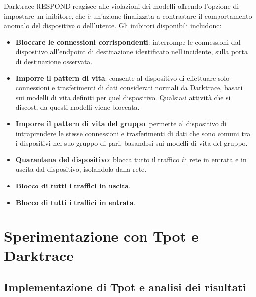 \documentclass[12pt,a4paper,oneside,onecolumn,openright]{book}
\begin{document}
	
	Darktrace RESPOND reagisce alle violazioni dei modelli offrendo l'opzione di impostare 
	un inibitore, che è un'azione finalizzata a contrastare il comportamento anomalo del 
	dispositivo o dell'utente. Gli inibitori disponibili includono:
	\begin{itemize}
		\item \textbf{Bloccare le connessioni corrispondenti}: interrompe le connessioni dal dispositivo all'endpoint di destinazione identificato nell'incidente, sulla porta di destinazione osservata.
		\item \textbf{Imporre il pattern di vita}: consente al dispositivo di effettuare solo connessioni e trasferimenti di dati considerati normali da Darktrace, basati sui modelli di vita definiti per quel dispositivo. Qualsiasi attività che si discosti da questi modelli viene bloccata.
		\item \textbf{Imporre il pattern di vita del gruppo}: permette al dispositivo di intraprendere le stesse connessioni e trasferimenti di dati che sono comuni tra i dispositivi nel suo gruppo di pari, basandosi sui modelli di vita del gruppo.
		\item \textbf{Quarantena del dispositivo}: blocca tutto il traffico di rete in entrata e in uscita dal dispositivo, isolandolo dalla rete.
		\item \textbf{Blocco di tutti i traffici in uscita}.
		\item \textbf{Blocco di tutti i traffici in entrata}.\cite{respond}
	\end{itemize}
	
	\chapter{Sperimentazione con Tpot e Darktrace}
	\section{Implementazione di Tpot e analisi dei risultati}
\end{document}
